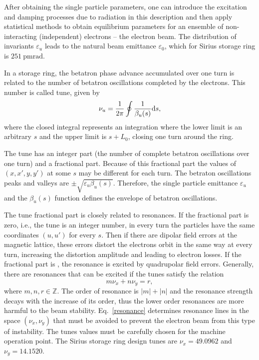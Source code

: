 After obtaining the single particle parameters, one can introduce the excitation and damping processes due to radiation in this description and then apply statistical methods to obtain equilibrium parameters for an ensemble of non-interacting (independent) electrons -- the electron beam. The distribution of invariants $\varepsilon_u$ leads to the natural beam emittance $\varepsilon_0$, which for Sirius storage ring is $\SI{251}{\pico\meter\radian}$.

In a storage ring, the betatron phase advance accumulated over one turn is related to the number of betatron oscillations completed by the electrons. This number is called tune, given by
\begin{equation}
    \nu_u = \dfrac{1}{2\pi} \oint \dfrac{1}{\beta_u({s})} \mathrm{d} {s},
\end{equation}
where the closed integral represents an integration where the lower limit is an arbitrary $s$ and the upper limit is $s + L_0$, closing one turn around the ring.

The tune has an integer part (the number of complete betatron oscillations over one turn) and a fractional part. Because of this fractional part the values of $(x, x', y, y')$ at some $s$ may be different for each turn. The betraton oscillations peaks and valleys are $\pm \sqrt{\varepsilon_u \beta_u(s)}$. Therefore, the single particle emittance $\varepsilon_u$ and the $\beta_u(s)$ function defines the envelope of betatron oscillations.

The tune fractional part is closely related to resonances. If the fractional part is zero, i.e., the tune is an integer number, in every turn the particles have the same coordinates $(u, u')$ for every $s$. Then if there are dipolar field errors at the magnetic lattice, these errors distort the electrons orbit in the same way at every turn, increasing the distortion amplitude and leading to electron losses. If the fractional part is , the resonance is excited by quadrupolar field errors. Generally, there are resonances that can be excited if the tunes satisfy the relation
\begin{equation}
    m \nu_x + n \nu_y = r,
    \label{resonance}
\end{equation}
where $m, n, r \in \mathbb{Z}$. The order of resonance is $|m| + |n|$ and the resonance strength decays with the increase of its order, thus the lower order resonances are more harmful to the beam stability. Eq.~\eqref{resonance} determines resonance lines in the space $(\nu_x, \nu_y)$ that must be avoided to prevent the electron beam from this type of instability. The tunes values must be carefully chosen for the machine operation point. The Sirius storage ring design tunes are $\nu_x = 49.0962$ and $\nu_y=14.1520$.

